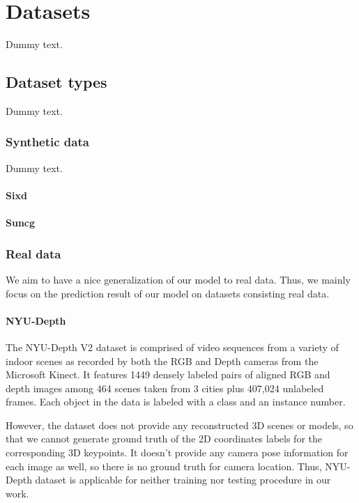 \chapter{Datasets}

Dummy text.

\section{Dataset types}

Dummy text.

\subsection{Synthetic data}

Dummy text.
\subsubsection{Sixd}


\subsubsection{Suncg}

\subsection{Real data}
We aim to have a nice generalization of our model to real data. Thus, we mainly focus on the prediction result of our model on datasets consisting real data.

\subsubsection{NYU-Depth}
The NYU-Depth V2 dataset is comprised of video sequences from a variety of indoor scenes as recorded by both the RGB and Depth cameras from the Microsoft Kinect. It features 1449 densely labeled pairs of aligned RGB and depth images among 464 scenes taken from 3 cities plus 407,024 unlabeled frames. Each object in the data is labeled with a class and an instance number.

However, the dataset does not provide any reconstructed 3D scenes or models, so that we cannot generate ground truth of the 2D coordinates labels for the corresponding 3D keypoints. It doesn't provide any camera pose information for each image as well, so there is no ground truth for camera location. Thus, NYU-Depth dataset is  applicable for neither training nor testing procedure in our work.

